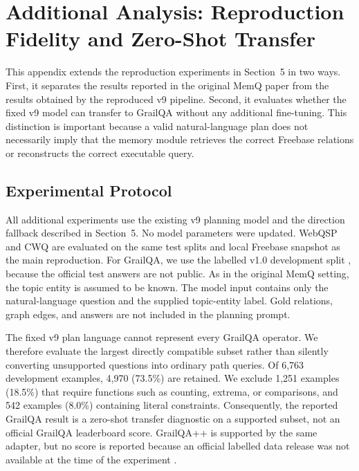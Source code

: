 
\section{Additional Analysis: Reproduction Fidelity and Zero-Shot Transfer}
\label{app:additional-analysis}

This appendix extends the reproduction experiments in Section~5 in two ways.
First, it separates the results reported in the original MemQ paper from the
results obtained by the reproduced v9 pipeline. Second, it evaluates whether
the fixed v9 model can transfer to GrailQA without any additional fine-tuning.
This distinction is important because a valid natural-language plan does not
necessarily imply that the memory module retrieves the correct Freebase
relations or reconstructs the correct executable query.

\subsection{Experimental Protocol}
\label{app:additional-protocol}

All additional experiments use the existing v9 planning model and the
direction fallback described in Section~5. No model parameters were updated.
WebQSP and CWQ are evaluated on the same test splits and local Freebase
snapshot as the main reproduction. For GrailQA, we use the labelled v1.0
development split \cite{guIIDThreeLevels2021}, because the official test
answers are not public. As in the original MemQ setting, the topic entity is
assumed to be known. The model input contains only the natural-language
question and the supplied topic-entity label. Gold relations, graph edges, and
answers are not included in the planning prompt.

The fixed v9 plan language cannot represent every GrailQA operator. We
therefore evaluate the largest directly compatible subset rather than silently
converting unsupported questions into ordinary path queries. Of 6,763
development examples, 4,970 (73.5\%) are retained. We exclude 1,251 examples
(18.5\%) that require functions such as counting, extrema, or comparisons, and
542 examples (8.0\%) containing literal constraints. Consequently, the
reported GrailQA result is a zero-shot transfer diagnostic on a supported
subset, not an official GrailQA leaderboard score. GrailQA++ is supported by
the same adapter, but no score is reported because an official labelled data
release was not available at the time of the experiment
\cite{duttGrailQAChallengingZeroShot2023}.

